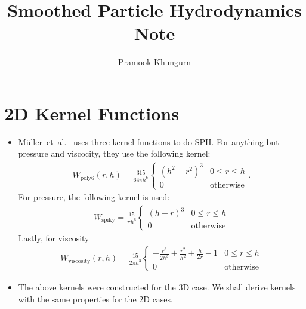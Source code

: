 \documentclass[10pt]{article}
\title{Smoothed Particle Hydrodynamics Note}
\author{Pramook Khungurn}
\newcommand{\etal}{{et~al.}}
\begin{document}
	\maketitle

  \section{2D Kernel Functions}
  \begin{itemize}
    \item M\"uller~\etal~\cite{Muller:2003} uses three kernel functions to do SPH. For anything but pressure and viscocity, they use the following kernel:
    \begin{align*}
      W_{\mathrm{poly6}}(r, h) = \frac{315}{64\pi h^6}
      \begin{cases}
        (h^2 - r^2)^3 & 0 \leq r \leq h \\
        0 & \mathrm{otherwise}
      \end{cases}.      
    \end{align*}
    For pressure, the following kernel is used:
    \begin{align*}
      W_{\mathrm{spiky}} = \frac{15}{\pi h^6}
      \begin{cases}
        (h-r)^3 & 0 \leq r \leq h\\
        0 & \mathrm{otherwise}
      \end{cases}
    \end{align*}
    Lastly, for viscosity
    \begin{align*}
      W_{\mathrm{viscosity}}(r, h) = \frac{15}{2\pi h^3}
      \begin{cases}
        -\frac{r^3}{2h^3} + \frac{r^2}{h^2} + \frac{h}{2r} - 1 & 0 \leq r \leq h\\
        0 & \mathrm{otherwise}
      \end{cases}
    \end{align*}

    \item The above kernels were constructed for the 3D case. We shall derive kernels with the same properties for the 2D cases.


\end{itemize}
\end{document}
